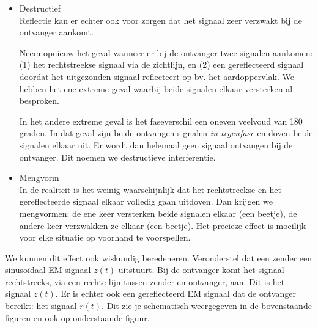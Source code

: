 \begin{itemize}
    \item Destructief \\
    Reflectie kan er echter ook voor zorgen dat het signaal zeer verzwakt bij de ontvanger aankomt. 
    
    
    Neem opnieuw het geval wanneer er bij de ontvanger twee signalen aankomen: (1) het rechtstreekse signaal via de zichtlijn, en (2) een gereflecteerd signaal doordat het uitgezonden signaal reflecteert op bv. het aardoppervlak. We hebben het ene extreme geval waarbij beide signalen elkaar versterken al besproken.
    
    In het andere extreme geval is het faseverschil een oneven veelvoud van 180 graden. In dat geval zijn beide ontvangen signalen \emph{in tegenfase} en doven beide signalen elkaar uit. Er wordt dan helemaal geen signaal ontvangen bij de ontvanger. Dit noemen we destructieve interferentie.
    \item Mengvorm \\
    In de realiteit is het weinig waarschijnlijk dat het rechtstreekse en het gereflecteerde signaal elkaar volledig gaan uitdoven. Dan krijgen we mengvormen: de ene keer versterken beide signalen elkaar (een beetje), de andere keer verzwakken ze elkaar (een beetje). Het precieze effect is moeilijk voor elke situatie op voorhand te voorspellen.
\end{itemize}

We kunnen dit effect ook wiskundig beredeneren. Veronderstel dat een zender een sinusoïdaal EM signaal $z(t)$ uitstuurt. Bij de ontvanger komt het signaal rechtstreeks, via een rechte lijn tussen zender en ontvanger, aan. Dit is het signaal $z(t)$. Er is echter ook een gereflecteerd EM signaal dat de ontvanger bereikt: het signaal $r(t)$. Dit zie je schematisch weergegeven in de bovenstaande figuren en ook op onderstaande figuur. 

\begin{center}
    
\end{center}

